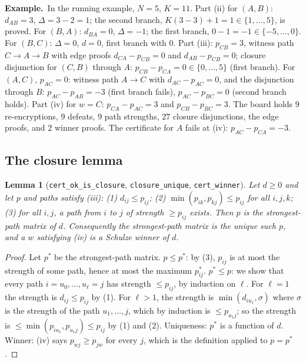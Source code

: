 \documentclass[11pt,a4paper]{article}
\newcommand{\rocq}[1]{\texttt{#1}}
\newcommand{\ex}[1]{\par\medskip\noindent\textbf{Example.}~#1\par\medskip}
\newtheorem{lemma}[theorem]{Lemma}
\theoremstyle{remark}
\begin{document}
\ex{In the running example, $N = 5$, $K = 11$. Part (ii) for $(A, B)$:
$d_{AB} = 3$, $\Delta = 3 - 2 = 1$; the second branch, $K(3 - 3) + 1 = 1
\in \{1, \ldots, 5\}$, is proved. For $(B, A)$: $d_{BA} = 0$, $\Delta =
-1$; the first branch, $0 - 1 = -1 \in \{-5, \ldots, 0\}$. For $(B, C)$:
$\Delta = 0$, $d = 0$, first branch with $0$. Part (iii): $p_{CB} = 3$,
witness path $C \to A \to B$ with edge proofs $d_{CA} - p_{CB} = 0$ and
$d_{AB} - p_{CB} = 0$; closure disjunction for $(C, B)$ through $A$:
$p_{CB} - p_{CA} = 0 \in \{0, \ldots, 5\}$ (first branch). For $(A, C)$,
$p_{AC} = 0$: witness path $A \to C$ with $d_{AC} - p_{AC} = 0$, and the
disjunction through $B$: $p_{AC} - p_{AB} = -3$ (first branch fails),
$p_{AC} - p_{BC} = 0$ (second branch holds). Part (iv) for $w = C$: $p_{CA}
- p_{AC} = 3$ and $p_{CB} - p_{BC} = 3$. The board holds $9$ re-encryptions,
$9$ defeats, $9$ path strengths, $27$ closure disjunctions, the edge
proofs, and $2$ winner proofs. The certificate for $A$ fails at (iv):
$p_{AC} - p_{CA} = -3$.}

\subsection{The closure lemma}
\begin{lemma}[\rocq{cert\_ok\_is\_closure}, \rocq{closure\_unique}, \rocq{cert\_winner}]
Let $d \ge 0$ and let $p$ and paths satisfy (iii): (1) $d_{ij} \le p_{ij}$;
(2) $\min(p_{ik}, p_{kj}) \le p_{ij}$ for all $i, j, k$; (3) for all $i,
j$, a path from $i$ to $j$ of strength $\ge p_{ij}$ exists. Then $p$ is the
strongest-path matrix of $d$. Consequently the strongest-path matrix is the
unique such $p$, and a $w$ satisfying (iv) is a Schulze winner of $d$.
\end{lemma}
\begin{proof}
Let $p^*$ be the strongest-path matrix. $p \le p^*$: by (3), $p_{ij}$ is at
most the strength of some path, hence at most the maximum $p^*_{ij}$.
$p^* \le p$: we show that every path $i = u_0, \ldots, u_\ell = j$ has
strength $\le p_{ij}$, by induction on $\ell$. For $\ell = 1$ the strength
is $d_{ij} \le p_{ij}$ by (1). For $\ell > 1$, the strength is $\min(d_{i
u_1}, \sigma)$ where $\sigma$ is the strength of the path $u_1, \ldots, j$,
which by induction is $\le p_{u_1 j}$; so the strength is $\le \min(p_{i
u_1}, p_{u_1 j}) \le p_{ij}$ by (1) and (2). Uniqueness: $p^*$ is a
function of $d$. Winner: (iv) says $p_{wj} \ge p_{jw}$ for every $j$, which
is the definition applied to $p = p^*$.
\end{proof}
\end{document}
